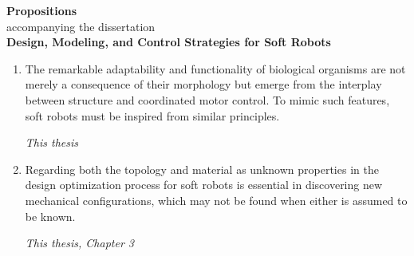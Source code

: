 \documentclass[a5paper]{article}
\renewcommand{\normalsize}{\fontsize{9}{9}\selectfont}
\newcommand{\largesize}{\fontsize{10}{9}\selectfont}
\begin{document}
\begin{center}
\largesize \textbf{Propositions} \\[0.45em]
\normalsize accompanying the dissertation \\[0.45em]
{\textbf{\largesize Design, Modeling, and Control Strategies for Soft Robots}}
\end{center}

\normalsize
\vspace{-1mm}

\begin{enumerate}
  \setlength\itemsep{0.75em}

  \item The remarkable adaptability and functionality of biological organisms are not merely a consequence of their morphology but emerge from the interplay between structure and coordinated motor control. To mimic such features, soft robots must be inspired from similar principles.
  \begin{flushright}
  \vspace{-2mm}
  \textit{This thesis}
  \vspace{-1mm}
  \end{flushright}

  
  \item Regarding both the topology and material as unknown properties in the design optimization process for soft robots is essential in discovering new mechanical configurations, which may not be found when either is assumed to be known. 
  \begin{flushright}
  \vspace{-5mm}
  \textit{This thesis, Chapter 3}
  \vspace{-1mm}
  \end{flushright}


\end{enumerate}
\end{document}
